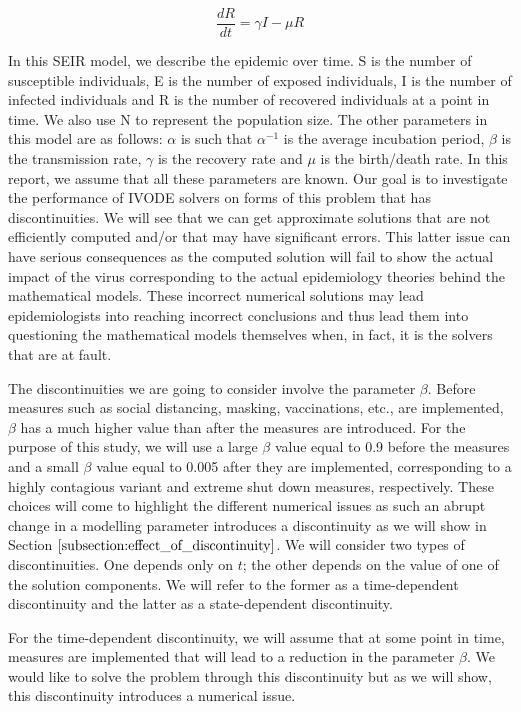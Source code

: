 \begin{equation}
\frac{\textit{d}R}{\textit{dt}} = \gamma I - \mu R \nonumber
\end{equation} 

In this SEIR model, we describe the epidemic over time. S is the number of susceptible individuals, E is the number of exposed individuals, I is the number of infected individuals and R is the number of recovered individuals at a point in time. We also use N to represent the population size.
The other parameters in this model are as follows: $\alpha$ is such that $\alpha^{-1}$ is the average incubation period, $\beta$ is the transmission rate, $\gamma$ is the recovery rate and $\mu$ is the birth/death rate. In this report, we assume that all these parameters are known. Our goal is to investigate the performance of IVODE solvers on forms of this problem that has discontinuities. We will see that we can get approximate solutions that are not efficiently computed and/or that may have significant errors. This latter issue can have serious consequences as the computed solution will fail to show the actual impact of the virus corresponding to the actual epidemiology theories behind the mathematical models. These incorrect numerical solutions may lead epidemiologists into reaching incorrect conclusions and thus lead them into questioning the mathematical models themselves when, in fact, it is the solvers that are at fault.

The discontinuities we are going to consider involve the parameter $\beta$.
Before measures such as social distancing, masking, vaccinations, etc., are implemented, $\beta$ has a much higher value than after the measures are introduced. For the purpose of this study, we will use a large $\beta$ value equal to 0.9 before the measures and a small $\beta$ value equal to 0.005 after they are implemented, corresponding to a highly contagious variant and extreme shut down measures, respectively. These choices will come to highlight the different numerical issues as such an abrupt change in a modelling parameter introduces a discontinuity as we will show in Section $\ref{subsection:effect_of_discontinuity}$. We will consider two types of discontinuities. One depends only on $t$; the other depends on the value of one of the solution components. We will refer to the former as a time-dependent discontinuity and the latter as a state-dependent discontinuity.

For the time-dependent discontinuity, we will assume that at some point in time, measures are implemented that will lead to a reduction in the parameter $\beta$. We would like to solve the problem through this discontinuity but as we will show, this discontinuity introduces a numerical issue.

